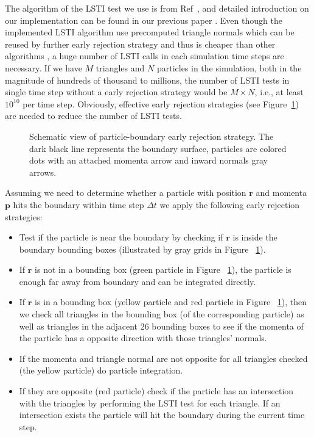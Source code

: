 \documentclass[aps,prstab,superscriptaddress,showpacs]{revtex4-1}
\begin{document}
The algorithm of the LSTI test we use is from Ref~, and detailed introduction on our implementation can be found in our previous paper \cite{WangHB2010:1}. Even though the implemented LSTI algorithm use precomputed triangle normals which can be reused by further early rejection strategy and thus is cheaper than other algorithms \cite{LT}, a huge number of LSTI calls in each simulation time steps are necessary. If we have $M$ triangles and $N$ particles in the simulation, both in the magnitude of hundreds of thousand to millions, the number of LSTI tests in single time step without a early rejection strategy would be $M \times N$, i.e., at least $10^{10}$ per time step. Obviously, effective early rejection strategies (see Figure~\ref{fig:P-B}) are needed to reduce the number of LSTI tests.  

\begin{figure}[H]
    \begin{center}
        
    \end{center}
    \caption{Schematic view of particle-boundary early rejection strategy. The dark
    black line represents the boundary surface, particles are colored dots with an
    attached momenta arrow and inward normals gray arrows.\label{fig:P-B}}
\end{figure}
Assuming we need to determine whether a particle with position $\mathbf{r}$
and momenta $\mathbf{p}$ hits the boundary within time step $\Delta{t}$ we apply
the following early rejection strategies:
\begin{itemize}
    \item Test if the particle is near the boundary by checking if $\mathbf{r}$
    is inside the boundary bounding boxes (illustrated by gray grids in
    Figure ~\ref{fig:P-B}). 
    \item If $\mathbf{r}$ is not in a bounding box (green particle in Figure
    ~\ref{fig:P-B}), the particle is enough far away from boundary and
    can be integrated directly.
    \item If $\mathbf{r}$ is in a bounding box (yellow particle and red particle
    in Figure ~\ref{fig:P-B}), then we check all triangles in the bounding box
    (of the corresponding particle) as well as triangles in the adjacent 26
    bounding boxes to see if the momenta of the particle has a opposite
    direction with those triangles' normals.
    \item If the momenta and triangle normal are not opposite for all triangles
    checked (the yellow particle) do particle integration.
    \item If they are opposite (red particle) check if the particle has an
    intersection with the triangles by performing the LSTI test for each
    triangle. If an intersection exists the particle will hit the boundary
    during the current time step.
\end{itemize}
\end{document}
